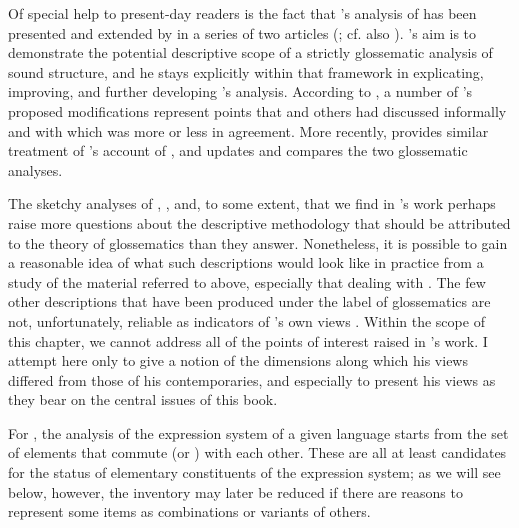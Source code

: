Of special help to present-day readers is the fact that {\Hjelmslev}'s
analysis of  has been presented and extended by {} in a
series of two articles
(\citealt{basboll71:hjelmslev1,basboll72:hjelmslev2}; cf. also
\citealt{efj72:note}). {}'s aim is to demonstrate the potential
descriptive scope of a strictly glossematic analysis of sound
structure, and he stays explicitly within that framework in
explicating, improving, and further developing {\Hjelmslev}'s
analysis. According to \citet{efj72:note}, a number of {}'s
proposed modifications represent points that {\Hjelmslev} and others had
discussed informally and with which {\Hjelmslev} was more or less in
agreement.  More recently, \citet{basboll17:hjelmslev.french} provides
similar treatment of {\Hjelmslev}'s account of , and
\citet{basboll21:glossematics} updates and compares the two
glossematic analyses.

The sketchy analyses of , , and, to some extent,
 that we find in {\Hjelmslev}'s work perhaps raise more
questions about the descriptive methodology that should be attributed
to the theory of glossematics than they answer. Nonetheless, it is
possible to gain a reasonable idea of what such descriptions would
look like in practice from a study of the material referred to above,
especially that dealing with . The few other descriptions that
have been produced under the label of glossematics are not,
unfortunately, reliable as indicators of {\Hjelmslev}'s own views
\citep{fischer-jorgensen75:trends}. Within the scope of this chapter,
we cannot address all of the points of interest raised in {\Hjelmslev}'s
work. I attempt here only to give a notion of the dimensions along
which his views differed from those of his contemporaries, and
especially to present his views as they bear on the central issues of
this book.

For {\Hjelmslev}, the analysis of the expression system of a given
language starts from the set of elements that commute (or )
with each other. These are all at least candidates for the status of
elementary constituents of the expression system; as we will see
below, however, the inventory may later be reduced if there are
reasons to represent some items as combinations or variants of others.

